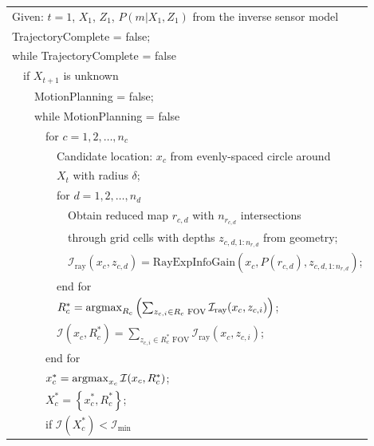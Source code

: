\documentclass[letterpaper, 10pt, conference]{ieeeconf}
\newcommand{\braces}[1]{\ensuremath{\left\{ #1 \right\}}}
\newcommand{\argmax}{\operatornamewithlimits{argmax}}
\begin{document}
\begin{table}
\vspace*{0.02\columnwidth}
\begin{tabular}{ l }
  Given: $t=1$, $X_{1}$, $Z_{1}$, $P(m|X_{1},Z_{1})$ from the inverse sensor model\\
  TrajectoryComplete = false;\\
  while TrajectoryComplete = false\\
  \ \ if $X_{t+1}$ is unknown\\
  \ \ \ \ MotionPlanning = false;\\
  \ \ \ \ while MotionPlanning = false\\
  \ \ \ \ \ \ for $c = 1,2,\ldots,n_c$\\
  \ \ \ \ \ \ \ \ Candidate location: $x_{c}$ from evenly-spaced circle around\\
  \ \ \ \ \ \ \ \ $X_t$ with radius $\delta$;\\
  \ \ \ \ \ \ \ \ for $d=1,2,\ldots,n_d$\\
  \ \ \ \ \ \ \ \ \ \ Obtain reduced map $r_{c,d}$ with $n_{r_{c,d}}$ intersections\\
  \ \ \ \ \ \ \ \ \ \ through grid cells with depths $z_{c,d,1:n_{r,d}}$ from geometry;\\
  \ \ \ \ \ \ \ \ \ \ $\mathcal I_\text{ray}(x_c,z_{c,d})=\text{RayExpInfoGain}(x_c,P(r_{c,d}),z_{c,d,1:n_{r,d}})$;\\
  \ \ \ \ \ \ \ \ end for\\
  \ \ \ \ \ \ \ \ $R_{c}^*=\argmax_{R_c}\left(\sum_{z_{c,i}\in R_c \text{ FOV}}\mathcal I_\text{ray}(x_c,z_{c,i})\right)$;\\%
  \ \ \ \ \ \ \ \ $\mathcal I(x_c,R_c^*)=\sum_{z_{c,i}\in R_c^* \text{ FOV}}\mathcal I_\text{ray}(x_c,z_{c,i})$;\\%
  \ \ \ \ \ \ end for\\
  \ \ \ \ \ \ $x_c^*=\argmax_{x_c}\mathcal I(x_c,R_c^*)$;\\
  \ \ \ \ \ \ $X_c^*=\braces{x_c^*,R_c^*}$;\\
  \ \ \ \ \ \ if $\mathcal I(X_c^*)<\mathcal I_\text{min}$\\

\end{tabular}
\end{table}
\end{document}
